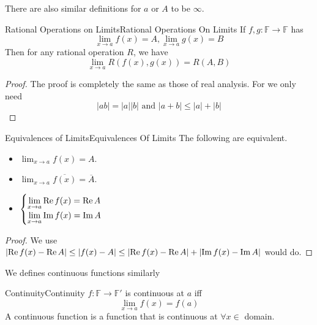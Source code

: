 \documentclass[../main.tex]{subfiles}
\begin{document}
There are also similar definitions for $a$ or $A$ to be $\infty $.

\begin{theorem}{Rational Operations on Limits}{Rational Operations On Limits}
If $f,g: \mathbb{F}\rightarrow \mathbb{F}$ has 
\begin{equation*}
\lim_{x \to a} f(x) = A, \lim_{x \to a} g(x) = B
\end{equation*}
Then for any rational operation $R$, we have
\begin{equation*}
\lim_{x \to a} R(f(x),g(x)) = R(A,B)
\end{equation*}
\end{theorem}
\begin{proof}
The proof is completely the same as those of real analysis. For we only need 
\begin{equation*}
\left|ab\right|= \left|a\right|\left|b\right| \text{ and } \left|a+b\right|\leq \left|a\right|+\left|b\right|
\end{equation*}
\end{proof}

\begin{theorem}{Equivalences of Limits}{Equivalences Of Limits}
The following are equivalent.
\begin{itemize}
\item $\displaystyle \lim_{x \to a} f(x) = A$.
\item $\displaystyle \lim_{x \to a} \overline{f(x)} = \overline{A}$.
\item $\displaystyle 
	\begin{cases}
	\displaystyle \lim_{x \to a} \operatorname{Re} f(x) = \operatorname{Re} A\\
	\displaystyle \lim_{x \to a} \operatorname{Im} f(x) = \operatorname{Im} A
	\end{cases}$
\end{itemize}
\end{theorem}
\begin{proof}
We use $\left|\operatorname{Re} f(x)-\operatorname{Re} A\right| \leq \left|f(x)-A\right|\leq \left|\operatorname{Re} f(x)-\operatorname{Re} A\right| + \left|\operatorname{Im} f(x)-\operatorname{Im} A\right|$ would do.
\end{proof}

We defines continuous functions similarly
\begin{definition}{Continuity}{Continuity}
$f: \mathbb{F}\rightarrow \mathbb{F}'$ is continuous at $a$ iff 
\begin{equation*}
\lim_{x \to a} f(x) = f(a)
\end{equation*}
A continuous function is a function that is continuous at $\forall x\in $ domain.
\end{definition}
\end{document}
